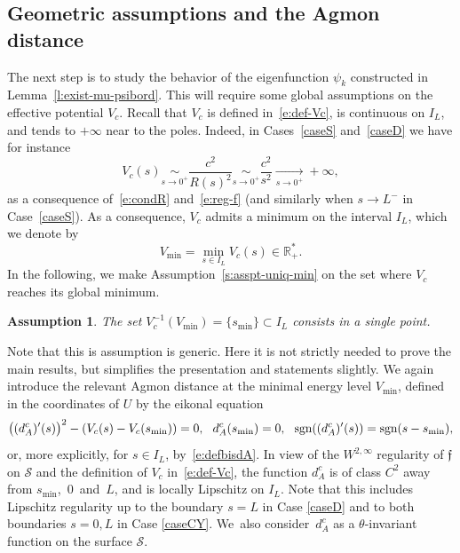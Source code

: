 \documentclass[JEP,XML,SOM,Unicode]{cedram}
\newtheorem{assumption}[lemma]{Assumption}
\theoremstyle{definition}
\newcommand{\calS}{\ensuremath{\mathcal S}}
\newcommand{\mb}[1]{\ensuremath{\mathbb{#1}}}
\newcommand{\R}{{\mb{R}}}
\newcommand{\f}{\ensuremath{\mathfrak{f}}}
\newcommand\sgn{\textnormal{sgn}}
\newcommand{\ce}{c}
\begin{document}
\subsection{Geometric assumptions and the Agmon distance}
The next step is to study the behavior of the eigenfunction $\psi_k$ constructed in Lemma~\ref{l:exist-mu-psibord}. This will require some global assumptions on the effective potential $V_\ce$. Recall that $V_\ce$ is defined in~\eqref{e:def-Vc}, is continuous on $I_L$, and tends to $+\infty$ near to the poles. Indeed, in Cases~\ref{caseS} and~\ref{caseD} we have for instance
\[
V_c(s)\underset{s\to 0^+}\sim\frac{c^2}{R(s)^2}\underset{s\to 0^+}\sim \frac{c^2}{s^2} \underset{s\to 0^+}\to +\infty,
\]
as a consequence of~\eqref{e:condR} and~\eqref{e:reg-f} (and similarly when $s\to L^-$ in Case~\ref{caseS}).
As a consequence, $V_\ce$ admits a minimum on the interval $I_L$, which we denote by
\[
V_{\min} = \min_{s \in I_L} V_\ce(s) \in \R_+^*.
\]
In the following, we make Assumption~\eqref{s:asspt-uniq-min} on the set where $V_\ce$ reaches its global minimum.
\begin{assumption}
\label{a:single-min}
The set $V_{\ce}^{-1}(V_{\min}) = \{s_{\min}\} \subset I_L$ consists in a single point.
\end{assumption}
Note that this is assumption is generic. Here it is not strictly needed to prove the main results, but simplifies the presentation and statements slightly.
We again introduce the relevant Agmon distance at the minimal energy level $V_{\min}$, defined in the coordinates of $U$ by the eikonal equation
\[
\big((d_A^{\ce})'(s) \big)^2-\left( V_\ce(s)- V_\ce(s_{\min}) \right) = 0, \ \ d_A^{\ce}(s_{\min})=0, \ \ \sgn((d_A^{\ce})'(s)) =\sgn(s-s_{\min}),
\]
or, more explicitly, for $s\in I_L$, by~\eqref{e:defbisdA}.
In view of the $W^{2,\infty}$ regularity of $\f$ on $\calS$ and the definition of $V_\ce$ in~\eqref{e:def-Vc}, the function $d_A^{\ce}$ is of class $C^2$ away from $s_{\min}$,~$0$~and~$L$, and is locally Lipschitz on $I_L$. Note that this includes Lipschitz regularity up to the boundary $s=L$ in Case \ref{caseD} and to both boundaries $s=0,L$ in Case \ref{caseCY}.
We~also consider~$d_A^{\ce}$ as a $\theta$-invariant function on the surface $\calS$.
\end{document}
